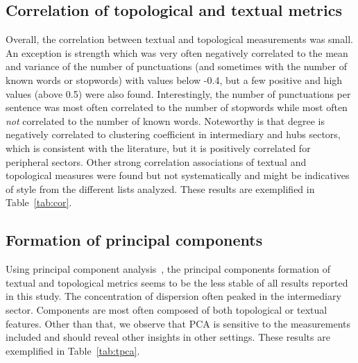 \documentclass[review]{elsarticle}
\begin{document}
\subsection{Correlation of topological and textual metrics}\label{subsec:cor}
Overall, the correlation between textual and topological measurements was small. 
An exception is strength which was very often negatively correlated to the mean and variance of the number
of punctuations (and sometimes with the number of known words or stopwords) with values below -0.4, but a few positive and high values (above 0.5) were also found.
Interestingly, the number of punctuations per sentence was most often correlated to the number of stopwords
while most often \emph{not} correlated to the number of known words.
Noteworthy is that degree is negatively correlated to clustering coefficient in intermediary and hubs sectors,
which is consistent with the literature, but it is positively correlated for
peripheral sectors.
Other strong correlation associations of textual and topological measures were found
but not systematically and might be indicatives of style from the different lists analyzed.
These results are exemplified in Table~\ref{tab:cor}.
\bgroup
\def\arraystretch{0.7}

\egroup
\FloatBarrier
\subsection{Formation of principal components}\label{subsec:pc}
Using principal component analysis~\cite{pca}, the principal components formation of textual and topological metrics
seems to be the less stable of all results reported in this study.
The concentration of dispersion often peaked in the intermediary sector.
Components are most often composed of both topological or textual features.
Other than that, we observe that PCA is sensitive to the measurements included
and should reveal other insights in other settings.
These results are exemplified in Table~\ref{tab:tpca}.
\bgroup
\def\arraystretch{0.7}

\egroup
\end{document}
